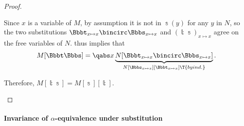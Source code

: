 \begin{proof}
\begin{itemize}
    Since \( x \) is a variable of \( M \), by assumption it is not in \( \Bbbs(y) \) for any \( y \) in \( N \), so the two substitutions \( \Bbbt_{x \mapsto x} \bincirc \Bbbs_{x \mapsto x} \) and \( (\Bbbt\Bbbs)_{x \mapsto x} \) agree on the free variables of \( N \).  thus implies that
    \begin{equation*}
      M[\Bbbt\Bbbs] = \qabs x \underbrace{N[\Bbbt_{x \mapsto x} \bincirc \Bbbs_{x \mapsto x}]}_{N[\Bbbs_{x \mapsto x}][\Bbbt_{x \mapsto x}] \T{by ind.}}.
    \end{equation*}

    Therefore, \( M[\Bbbt\Bbbs] = M[\Bbbs][\Bbbt] \).
  \end{itemize}
\end{proof}

\paragraph{Invariance of \( \alpha \)-equivalence under substitution}


